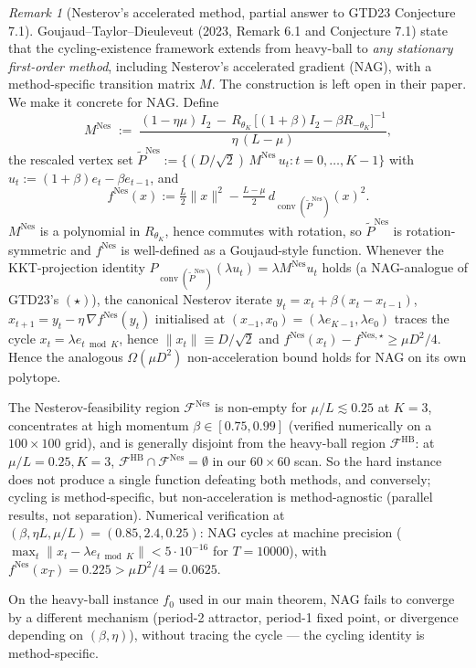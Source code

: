 \documentclass[11pt]{article}
\theoremstyle{definition}
\theoremstyle{remark}
\newtheorem{remark}[theorem]{Remark}
\DeclareMathOperator{\conv}{conv}
\begin{document}
\begin{remark}[Nesterov's accelerated method, partial answer to GTD23 Conjecture 7.1]
\label{rem:nesterov}
Goujaud--Taylor--Dieuleveut (2023, Remark 6.1 and Conjecture 7.1) state that the cycling-existence framework extends from heavy-ball to \emph{any stationary first-order method}, including Nesterov's accelerated gradient (NAG), with a method-specific transition matrix $M$. The construction is left open in their paper. We make it concrete for NAG. Define
\[
  M^{\mathrm{Nes}} \;:=\; \frac{(1-\eta\mu)\,I_2 \,-\, R_{\theta_K}\,\big[(1+\beta)I_2 - \beta R_{-\theta_K}\big]^{-1}}{\eta\,(L-\mu)},
\]
the rescaled vertex set $\widetilde P^{\mathrm{Nes}} := \{(D/\sqrt 2)\,M^{\mathrm{Nes}}\,u_t : t = 0, \ldots, K-1\}$ with $u_t := (1+\beta)e_t - \beta e_{t-1}$, and
\[
  f^{\mathrm{Nes}}(x) := \tfrac{L}{2}\|x\|^2 - \tfrac{L-\mu}{2}\,d_{\conv(\widetilde P^{\mathrm{Nes}})}(x)^2.
\]
$M^{\mathrm{Nes}}$ is a polynomial in $R_{\theta_K}$, hence commutes with rotation, so $\widetilde P^{\mathrm{Nes}}$ is rotation-symmetric and $f^{\mathrm{Nes}}$ is well-defined as a Goujaud-style function. Whenever the KKT-projection identity $P_{\conv(\widetilde P^{\mathrm{Nes}})}(\lambda u_t) = \lambda M^{\mathrm{Nes}} u_t$ holds (a NAG-analogue of GTD23's $(\star)$), the canonical Nesterov iterate $y_t = x_t + \beta(x_t - x_{t-1})$, $x_{t+1} = y_t - \eta\,\nabla f^{\mathrm{Nes}}(y_t)$ initialised at $(x_{-1}, x_0) = (\lambda e_{K-1}, \lambda e_0)$ traces the cycle $x_t = \lambda e_{t \bmod K}$, hence $\|x_t\| \equiv D/\sqrt 2$ and $f^{\mathrm{Nes}}(x_t) - f^{\mathrm{Nes},\star} \geq \mu D^2/4$. Hence the analogous $\Omega(\mu D^2)$ non-acceleration bound holds for NAG on its own polytope.

The Nesterov-feasibility region $\mathcal{F}^{\mathrm{Nes}}$ is non-empty for $\mu/L \lesssim 0.25$ at $K=3$, concentrates at high momentum $\beta \in [0.75, 0.99]$ (verified numerically on a $100\times 100$ grid), and is generally disjoint from the heavy-ball region $\mathcal{F}^{\mathrm{HB}}$: at $\mu/L = 0.25, K = 3$, $\mathcal{F}^{\mathrm{HB}} \cap \mathcal{F}^{\mathrm{Nes}} = \emptyset$ in our $60 \times 60$ scan. So the hard instance does not produce a single function defeating both methods, and conversely; cycling is method-specific, but non-acceleration is method-agnostic (parallel results, not separation). Numerical verification at $(\beta, \eta L, \mu/L) = (0.85, 2.4, 0.25)$: NAG cycles at machine precision ($\max_t \|x_t - \lambda e_{t \bmod K}\| < 5 \cdot 10^{-16}$ for $T = 10000$), with $f^{\mathrm{Nes}}(x_T) = 0.225 > \mu D^2/4 = 0.0625$.

On the heavy-ball instance $f_0$ used in our main theorem, NAG fails to converge by a different mechanism (period-2 attractor, period-1 fixed point, or divergence depending on $(\beta,\eta)$), without tracing the cycle --- the cycling identity is method-specific.
\end{remark}
\end{document}
